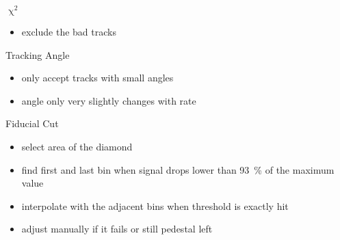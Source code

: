 \begin{frame}[noframenumbering]{$\upchi^2$}

	
	\begin{itemize}\itemfill
		\item exclude the bad tracks
	\end{itemize}
		
\end{frame}
\begin{frame}[noframenumbering]{Tracking Angle}

	
	\begin{itemize}\itemfill
		\item only accept tracks with small angles
		\item<2-> angle only very slightly changes with rate
	\end{itemize}
		
\end{frame}
\begin{frame}[noframenumbering]{Fiducial Cut}

	
	\begin{itemize}\itemfill
		\item select area of the diamond
		\item find first and last bin when signal drops lower than \SI{93}{\%} of the maximum value
		\item interpolate with the adjacent bins when threshold is exactly hit
		\item adjust manually if it fails or still pedestal left
	\end{itemize}
		
\end{frame}
